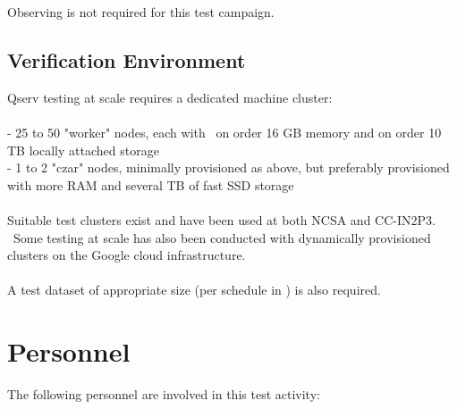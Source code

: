 \documentclass[DM,STR,toc]{lsstdoc}
\begin{document}
  Observing is not required for this test campaign.

\subsection{Verification Environment}
\label{sect:hwconf}
  Qserv testing at scale requires a dedicated machine cluster:\\
~\\
- 25 to 50 "worker" nodes, each with ~on order 16 GB memory and on order
10 TB locally attached storage\\
- 1 to 2 "czar" nodes, minimally provisioned as above, but preferably
provisioned with more RAM and several TB of fast SSD storage\\
~\\
Suitable test clusters exist and have been used at both NCSA and
CC-IN2P3. ~Some testing at scale has also been conducted with
dynamically provisioned clusters on the Google cloud infrastructure.\\
~\\
A test dataset of appropriate size (per schedule in ) is also
required.





\section{Personnel}
\label{sect:personnel}

The following personnel are involved in this test activity:
\end{document}
